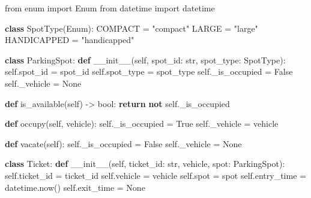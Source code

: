 \documentclass[11pt]{article}
\newenvironment{Shaded}{\begin{snugshade}}{\end{snugshade}}
\newcommand{\BuiltInTok}[1]{\textcolor[rgb]{0.50,0.55,0.55}{#1}}
\newcommand{\ControlFlowTok}[1]{\textcolor[rgb]{0.99,0.74,0.29}{\textbf{#1}}}
\newcommand{\FunctionTok}[1]{\textcolor[rgb]{0.56,0.27,0.68}{#1}}
\newcommand{\ImportTok}[1]{\textcolor[rgb]{0.15,0.68,0.38}{#1}}
\newcommand{\KeywordTok}[1]{\textcolor[rgb]{0.81,0.81,0.76}{\textbf{#1}}}
\newcommand{\NormalTok}[1]{\textcolor[rgb]{0.81,0.81,0.76}{#1}}
\newcommand{\OperatorTok}[1]{\textcolor[rgb]{0.81,0.81,0.76}{#1}}
\newcommand{\StringTok}[1]{\textcolor[rgb]{0.96,0.31,0.31}{#1}}
\newcommand{\VariableTok}[1]{\textcolor[rgb]{0.15,0.68,0.68}{#1}}
\begin{document}
\begin{Shaded}
\begin{Highlighting}[]
\ImportTok{from}\NormalTok{ enum }\ImportTok{import}\NormalTok{ Enum}
\ImportTok{from}\NormalTok{ datetime }\ImportTok{import}\NormalTok{ datetime}

\KeywordTok{class}\NormalTok{ SpotType(Enum):}
\NormalTok{    COMPACT }\OperatorTok{=} \StringTok{"compact"}
\NormalTok{    LARGE }\OperatorTok{=} \StringTok{"large"}
\NormalTok{    HANDICAPPED }\OperatorTok{=} \StringTok{"handicapped"}

\KeywordTok{class}\NormalTok{ ParkingSpot:}
    \KeywordTok{def} \FunctionTok{\_\_init\_\_}\NormalTok{(}\VariableTok{self}\NormalTok{, spot\_id: }\BuiltInTok{str}\NormalTok{, spot\_type: SpotType):}
        \VariableTok{self}\NormalTok{.spot\_id }\OperatorTok{=}\NormalTok{ spot\_id}
        \VariableTok{self}\NormalTok{.spot\_type }\OperatorTok{=}\NormalTok{ spot\_type}
        \VariableTok{self}\NormalTok{.\_is\_occupied }\OperatorTok{=} \VariableTok{False}
        \VariableTok{self}\NormalTok{.\_vehicle }\OperatorTok{=} \VariableTok{None}

    \KeywordTok{def}\NormalTok{ is\_available(}\VariableTok{self}\NormalTok{) }\OperatorTok{{-}\textgreater{}} \BuiltInTok{bool}\NormalTok{:}
        \ControlFlowTok{return} \KeywordTok{not} \VariableTok{self}\NormalTok{.\_is\_occupied}

    \KeywordTok{def}\NormalTok{ occupy(}\VariableTok{self}\NormalTok{, vehicle):}
        \VariableTok{self}\NormalTok{.\_is\_occupied }\OperatorTok{=} \VariableTok{True}
        \VariableTok{self}\NormalTok{.\_vehicle }\OperatorTok{=}\NormalTok{ vehicle}

    \KeywordTok{def}\NormalTok{ vacate(}\VariableTok{self}\NormalTok{):}
        \VariableTok{self}\NormalTok{.\_is\_occupied }\OperatorTok{=} \VariableTok{False}
        \VariableTok{self}\NormalTok{.\_vehicle }\OperatorTok{=} \VariableTok{None}

\KeywordTok{class}\NormalTok{ Ticket:}
    \KeywordTok{def} \FunctionTok{\_\_init\_\_}\NormalTok{(}\VariableTok{self}\NormalTok{, ticket\_id: }\BuiltInTok{str}\NormalTok{, vehicle, spot: ParkingSpot):}
        \VariableTok{self}\NormalTok{.ticket\_id }\OperatorTok{=}\NormalTok{ ticket\_id}
        \VariableTok{self}\NormalTok{.vehicle }\OperatorTok{=}\NormalTok{ vehicle}
        \VariableTok{self}\NormalTok{.spot }\OperatorTok{=}\NormalTok{ spot}
        \VariableTok{self}\NormalTok{.entry\_time }\OperatorTok{=}\NormalTok{ datetime.now()}
        \VariableTok{self}\NormalTok{.exit\_time }\OperatorTok{=} \VariableTok{None}


\end{Highlighting}
\end{Shaded}
\end{document}
